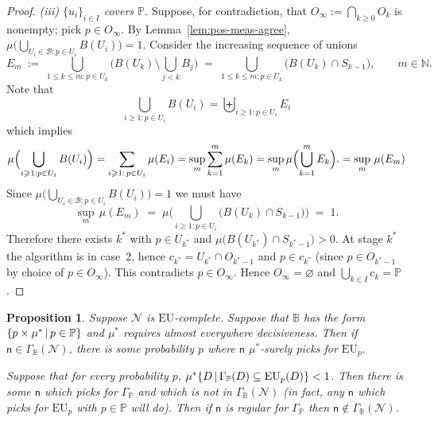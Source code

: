 \documentclass[a4paper]{article}
\newtheorem{proposition}[theorem]{Proposition}
\renewcommand\P{\mathbb{P}} %
\newcommand\EU{\mathrm{EU}}
\newcommand\Maximin{\Gamma}
\newcommand{\n}{\mathsf{n}}
\newcommand\Nu{\mathcal{N}}
\newcommand{\IB}{\mathbb{B}}
\newcommand{\IP}{\P}
\renewcommand{\color}[1]{}
\newenvironment{colored}[1]{\leavevmode\color{#1}}{}
\newcommand\SetDelimiter[1][]{
	\nonscript\,#1\vert \allowbreak \nonscript\,\mathopen{}}
\providecommand\given{\SetDelimiter}
\renewcommand{\emptyset}{\varnothing}
\renewcommand{\geq}{\geqslant}
\newenvironment{CCM rewritten}
{\begingroup\color{blue}} %
{\endgroup}              %
\begin{document}
\begin{proof}
\emph{(iii) $\{u_i\}_{i\in I}$ covers $\IP$.} Suppose, for contradiction, that $O_\infty:=\bigcap_{k\ge 0} O_k$ is nonempty; pick $p\in O_\infty$. By Lemma~\ref{lem:pos-meas-agree}, $\mu\big(\bigcup_{U_i\in\mathcal{B}: p\in U_i} B(U_i)\big)=1$. Consider the increasing sequence of unions
\[
E_m\ :=\ \bigcup_{1\le k\le m: p\in U_k} \Big(B(U_k)\setminus \bigcup_{j<k} B_j\Big)
\;=\;
\bigcup_{1\le k\le m: p\in U_k} \big(B(U_k)\cap S_{k-1}\big),
\qquad m\in\mathbb{N}.
\]
Note that 
\[
\bigcup_{i\geq 1: p\in U_i}B(U_i)=\biguplus_{i\geq 1: p\in U_i}E_i
\]
which implies
\[
\mu\Bigl(\bigcup_{i\geq 1: p\in U_i}B(U_i)\Bigr)
=\sum_{i\geq 1:\,p\in U_i}\mu(E_i)
=\sup_{m}\sum_{k=1}^m\mu(E_k)
=\sup_{m}\mu\Bigl(\bigcup_{k=1}^mE_k\Bigr).
=\sup_{m}\, \mu(E_m)
\]
Since $\mu\big(\bigcup_{U_i\in\mathcal{B}: p\in U_i} B(U_i)\big)=1$ we must have
\[
\sup_{m}\, \mu(E_m)\;=\; \mu\Big(\bigcup_{i\ge 1:p\in U_i} \big(B(U_k)\cap S_{k-1}\big)\Big)\;=\;1.
\]
Therefore there exists $k^\ast$ with $p\in U_{k^\ast}$ and $\mu\big(B(U_{k^\ast})\cap S_{k^\ast-1}\big)>0$. At stage $k^\ast$ the algorithm is in case~2, hence $c_{k^\ast}=U_{k^\ast}\cap O_{k^\ast-1}$ and $p\in c_{k^\ast}$ (since $p\in O_{k^\ast-1}$ by choice of $p\in O_\infty$). This contradicts $p\in O_\infty$. Hence $O_\infty=\emptyset$ and $\bigcup_{k\in I} c_k=\IP$.
\end{proof}
















	\begin{proposition}Suppose $\Nu$ is $\EU$-complete. Suppose that 
		$\IB$ has the form $\{p\times \mu^*\given p\in \IP\}$ and $\mu^*$ requires almost everywhere decisiveness. Then if $\n \in \Maximin_\IB(\Nu)$, there is some probability $p$ where $\n$ $\mu^*$-surely picks for $\EU_p$.
		
		Suppose that for every probability $p$, $\mu^*\{D\given \Maximin_\IP(D)\subseteq\EU_p(D)\}<1$. 
\begin{colored}{blue}
			Then there is some $\n$ which picks for $\Maximin_\IP$ and which is not in $\Maximin_\IB(\Nu)$ (in fact, any $\n$ which picks for $\EU_p$ with $p\in\IP$ will do). 
\end{colored}
		Then if $\n$ is regular for $\Maximin_\IP$ then $\n\notin \Maximin_\IB(\Nu)$. %
	\end{proposition}
\end{document}
